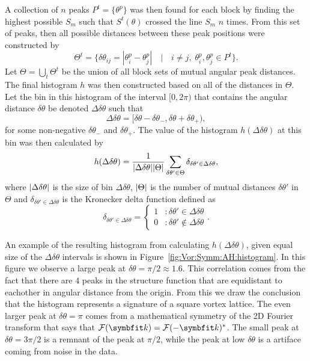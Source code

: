 A collection of $n$ peaks $P^t = \{\theta^p\}$ was then found for each block by finding the highest possible $S_m$ such that $S^t(\theta)$ crossed the line $S_m$ $n$ times. From this set of peaks,
then all possible distances between these peak positions were constructed by
\begin{equation}
    \label{eq:Vor:Symm:AH:mutualDistances}
    \Theta^t = \{\delta\theta_{ij} = |\theta^p_i-\theta^p_j|\quad|\quad i\neq j,\;\theta_i^p,\theta_j^p\in P^t\}.
\end{equation}
Let $\Theta = \bigcup_t\Theta^t$ be the union of all block sets of mutual angular peak distances. The final histogram $h$ was then constructed based on all of the distances in $\Theta$. Let the bin
in this histogram of the interval $[0,2\pi)$ that contains the angular distance $\delta\theta$ be denoted $\Delta\delta\theta$ such that 
\begin{equation}
    \label{eq:Vor:Symm:AH:mutualDistancesBin}
    \Delta\delta\theta = [\delta\theta-\delta\theta_-,\delta\theta+\delta\theta_+),
\end{equation}
for some non-negative $\delta\theta_-$ and $\delta\theta_+$. The value of the histogram $h(\Delta\delta\theta)$ at this bin was then calculated by
\begin{equation}
    \label{eq:Vor:Symm:AH:histogramDef}
    h(\Delta\delta\theta) = \frac{1}{\lvert \Delta\delta\theta \rvert\lvert \Theta \rvert}\sum_{\delta\theta'\in\Theta}\delta_{\delta\theta'\in\Delta\delta\theta},
\end{equation}
where $\lvert \Delta\delta\theta \rvert$ is the size of bin $\Delta\delta\theta$, $\lvert \Theta \rvert$ is the number of mutual distances $\delta\theta'$ in $\Theta$
and $\delta_{\delta\theta'\in\Delta\delta\theta}$ is the Kronecker delta function defined as
\begin{equation}
    \label{eq:Vor:Symm:AH:kroneckerDelta}
    \delta_{\delta\theta'\in\Delta\delta\theta} = \left\{
    \begin{array}{lr}
        1 & : \delta\theta'\in\Delta\delta\theta \\
        0 & : \delta\theta'\notin\Delta\delta\theta
    \end{array}\right. .
\end{equation}

An example of the resulting histogram from calculating $h(\Delta\delta\theta)$, given equal size of the $\Delta\delta\theta$ intervals is shown in Figure~\ref{fig:Vor:Symm:AH:histogram}.
In this figure we observe a large peak at $\delta\theta = \pi/2 \approx 1.6$. This correlation comes from the fact that there are $4$ peaks in the structure function
that are equidistant to eachother in angular distance from the origin. From this we draw the conclusion that the histogram represents a signature of a square vortex
lattice. The even larger peak at $\delta\theta = \pi$ comes from a mathematical symmetry of the 2D Fourier transform
that says that $\mathcal{F}(\v{k}) = \mathcal{F}(-\v{k})^\ast$. The small peak at $\delta\theta = 3\pi/2$ is a remnant of the peak at $\pi/2$, while the peak at low $\delta\theta$
is a artiface coming from noise in the data.

